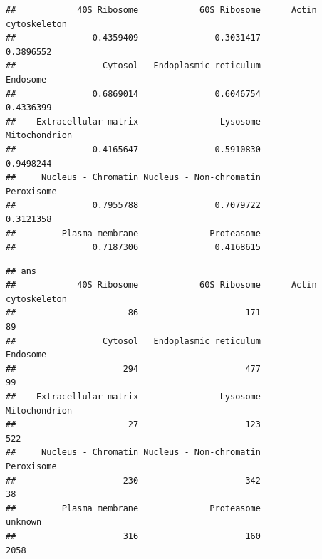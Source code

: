 \begin{knitrout}
\color{fgcolor}\begin{kframe}
\begin{alltt}
 \hlkwb{<-}   \hlstd{=} \hlstd{,}  \hlstd{=} \hlstd{,}  \hlstd{=} \hlstd{,}  \hlstd{=} \hlstd{)}
\end{alltt}
\begin{verbatim}
##            40S Ribosome            60S Ribosome      Actin cytoskeleton 
##               0.4359409               0.3031417               0.3896552 
##                 Cytosol   Endoplasmic reticulum                Endosome 
##               0.6869014               0.6046754               0.4336399 
##    Extracellular matrix                Lysosome           Mitochondrion 
##               0.4165647               0.5910830               0.9498244 
##     Nucleus - Chromatin Nucleus - Non-chromatin              Peroxisome 
##               0.7955788               0.7079722               0.3121358 
##         Plasma membrane              Proteasome 
##               0.7187306               0.4168615
\end{verbatim}
\begin{alltt}
 \hlkwb{<-}   \hlstd{=} \hlstd{,}  \hlstd{=} \hlstd{,}  \hlstd{=} \hlstd{,}  
\end{alltt}
\begin{verbatim}
## ans
##            40S Ribosome            60S Ribosome      Actin cytoskeleton 
##                      86                     171                      89 
##                 Cytosol   Endoplasmic reticulum                Endosome 
##                     294                     477                      99 
##    Extracellular matrix                Lysosome           Mitochondrion 
##                      27                     123                     522 
##     Nucleus - Chromatin Nucleus - Non-chromatin              Peroxisome 
##                     230                     342                      38 
##         Plasma membrane              Proteasome                 unknown 
##                     316                     160                    2058
\end{verbatim}
\end{kframe}
\end{knitrout}

